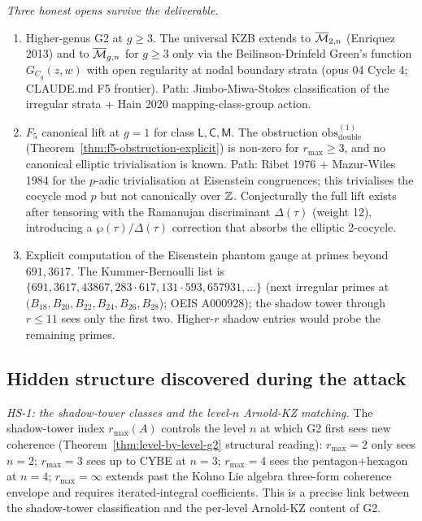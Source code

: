\emph{Three honest opens survive the deliverable.}

\begin{enumerate}
\item[(F-G2-1)] Higher-genus G2 at $g \ge 3$. The universal KZB
   extends to $\overline{\mathcal{M}}_{2,n}$ (Enriquez 2013) and to $\overline{\mathcal{M}}_{g,n}$
   for $g \ge 3$ only via the Beilinson-Drinfeld Green's function
   $G_{C_g}(z,w)$ with open regularity at nodal boundary strata (opus 04
   Cycle 4; CLAUDE.md F5 frontier). Path: Jimbo-Miwa-Stokes
   classification of the irregular strata + Hain 2020 mapping-class-group
   action.

\item[(F-G2-2)] $F_5$ canonical lift at $g = 1$ for class
   $\mathsf{L}, \mathsf{C}, \mathsf{M}$. The obstruction
   $\mathrm{obs}^{(1)}_{\mathrm{double}}$ (Theorem~\ref{thm:f5-obstruction-explicit})
   is non-zero for $r_{\max} \ge 3$, and no canonical elliptic
   trivialisation is known. Path: Ribet 1976 + Mazur-Wiles 1984 for the
   $p$-adic trivialisation at Eisenstein congruences; this
   trivialises the cocycle mod $p$ but not canonically over $\mathbb{Z}$.
   Conjecturally the full lift exists after tensoring with the
   Ramanujan discriminant $\Delta(\tau)$ (weight 12), introducing a
   $\wp(\tau)/\Delta(\tau)$ correction that absorbs the elliptic 2-cocycle.

\item[(F-GRT-Eis)] Explicit computation of the Eisenstein phantom gauge
   at primes beyond $691, 3617$. The Kummer-Bernoulli list is
   $\{691, 3617, 43867, 283\cdot617, 131\cdot593, 657931, \ldots\}$
   (next irregular primes at $(B_{18}, B_{20}, B_{22}, B_{24}, B_{26}, B_{28}$);
   OEIS A000928); the shadow tower through $r \le 11$ sees only the
   first two. Higher-$r$ shadow entries would probe the remaining
   primes.
\end{enumerate}

\subsection*{Hidden structure discovered during the attack}

\emph{HS-1: the shadow-tower classes and the level-$n$ Arnold-KZ
matching.}
The shadow-tower index $r_{\max}(A)$ controls the level $n$ at which
G2 first sees new coherence (Theorem~\ref{thm:level-by-level-g2}
structural reading): $r_{\max} = 2$ only sees $n = 2$; $r_{\max} = 3$
sees up to CYBE at $n = 3$; $r_{\max} = 4$ sees the pentagon+hexagon at
$n = 4$; $r_{\max} = \infty$ extends past the Kohno Lie algebra
three-form coherence envelope and requires iterated-integral
coefficients. This is a precise link between the shadow-tower
classification and the per-level Arnold-KZ content of G2.

